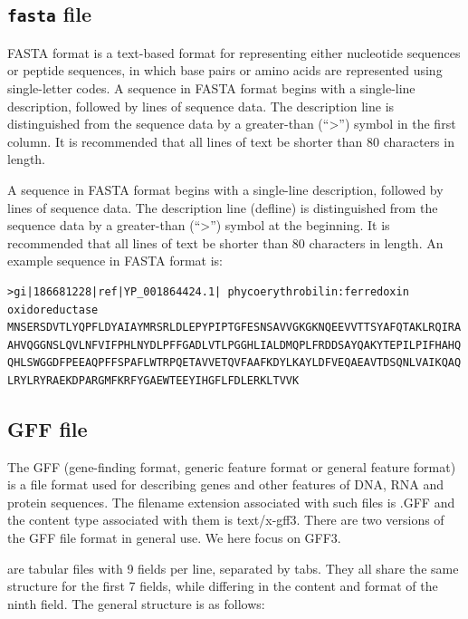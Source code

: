 \documentclass[]{book}
\begin{document}
\hypertarget{fasta-file}{%
\subsection{\texorpdfstring{\texttt{fasta} file}{fasta file}}\label{fasta-file}}

FASTA format is a text-based format for representing either nucleotide sequences or peptide sequences, in which base pairs or amino acids are represented using single-letter codes. A sequence in FASTA format begins with a single-line description, followed by lines of sequence data. The description line is distinguished from the sequence data by a greater-than (``\textgreater{}'') symbol in the first column. It is recommended that all lines of text be shorter than 80 characters in length.

A sequence in FASTA format begins with a single-line description, followed by lines of sequence data. The description line (defline) is distinguished from the sequence data by a greater-than (``\textgreater{}'') symbol at the beginning. It is recommended that all lines of text be shorter than 80 characters in length. An example sequence in FASTA format is:

\begin{verbatim}
>gi|186681228|ref|YP_001864424.1| phycoerythrobilin:ferredoxin oxidoreductase
MNSERSDVTLYQPFLDYAIAYMRSRLDLEPYPIPTGFESNSAVVGKGKNQEEVVTTSYAFQTAKLRQIRA
AHVQGGNSLQVLNFVIFPHLNYDLPFFGADLVTLPGGHLIALDMQPLFRDDSAYQAKYTEPILPIFHAHQ
QHLSWGGDFPEEAQPFFSPAFLWTRPQETAVVETQVFAAFKDYLKAYLDFVEQAEAVTDSQNLVAIKQAQ
LRYLRYRAEKDPARGMFKRFYGAEWTEEYIHGFLFDLERKLTVVK
\end{verbatim}

\hypertarget{gff-file}{%
\subsection{GFF file}\label{gff-file}}

The GFF (gene-finding format, generic feature format or general feature format) is a file format used for describing genes and other features of DNA, RNA and protein sequences. The filename extension associated with such files is .GFF and the content type associated with them is text/x-gff3. There are two versions of the GFF file format in general use. We here focus on GFF3.

are tabular files with 9 fields per line, separated by tabs. They all share the same structure for the first 7 fields, while differing in the content and format of the ninth field. The general structure is as follows:
\end{document}
